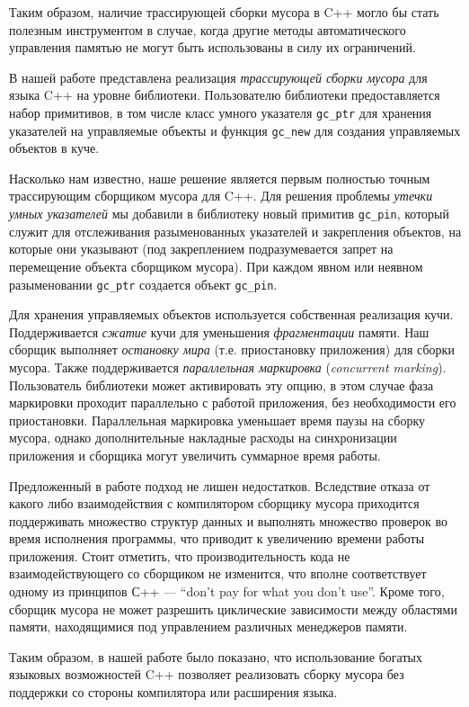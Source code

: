 \documentclass[10pt]{article}
\newcommand{\code}{\texttt}
\begin{document}
Таким образом, наличие трассирующей сборки мусора в C++
могло бы стать полезным инструментом в случае, 
когда другие методы автоматического управления памятью 
не могут быть использованы в силу их ограничений.

В нашей работе представлена реализация \emph{трассирующей сборки мусора} 
для языка C++ на уровне библиотеки. 
Пользователю библиотеки предоставляется набор примитивов, 
в том числе класс умного указателя \code{gc\_ptr} для хранения
указателей на управляемые объекты и 
функция \code{gc\_new} для создания управляемых объектов в куче.

Насколько нам известно, наше решение является первым
полностью точным трассирующим сборщиком мусора для C++.
Для решения проблемы \emph{утечки умных указателей}\cite{Jon96}
мы добавили в библиотеку новый примитив \code{gc\_pin},
который служит для отслеживания разыменованных указателей
и закрепления объектов, на которые они указывают 
(под закреплением подразумевается запрет на перемещение объекта 
сборщиком мусора). При каждом явном или неявном разыменовании \code{gc\_ptr}
создается объект \code{gc\_pin}. 

Для хранения управляемых объектов используется собственная реализация кучи.
Поддерживается \emph{сжатие} кучи для уменьшения \emph{фрагментации} памяти.
Наш сборщик выполняет \emph{остановку мира} (т.е. приостановку приложения)
для сборки мусора. 
Также поддерживается \emph{параллельная маркировка} (\emph{concurrent marking}).
Пользователь библиотеки может активировать эту опцию,
в этом случае фаза маркировки проходит параллельно с работой приложения, 
без необходимости его приостановки. 
Параллельная маркировка уменьшает время паузы на сборку мусора, 
однако дополнительные накладные расходы на синхронизации приложения и сборщика
могут увеличить суммарное время работы.

Предложенный в работе подход не лишен недостатков. 
Вследствие отказа от какого либо взаимодействия с компилятором
сборщику мусора приходится поддерживать множество структур данных и выполнять 
множество проверок во время исполнения программы, 
что приводит к увеличению времени работы приложения.
Стоит отметить, что производительность кода не взаимодействующего со сборщиком не изменится, 
что вполне соответствует одному из принципов С++ --- ``don’t pay for what you don’t use''.
Кроме того, сборщик мусора не может разрешить циклические зависимости
между областями памяти, находящимися под управлением различных менеджеров памяти.

Таким образом, в нашей работе было показано, 
что использование богатых языковых возможностей C++ 
позволяет реализовать сборку мусора 
без поддержки со стороны компилятора или расширения языка.



\end{document}
